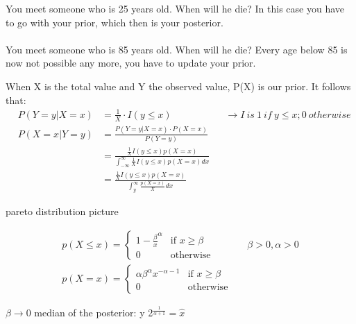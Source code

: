 \documentclass[../main/Notes.tex]{subfiles}
\begin{document}
\begin{minipage}[b][3.5cm][t]{7.1cm}
\end{minipage}
\begin{minipage}[b][4cm][t]{9.1cm}
\bigskip
You meet someone who is 25 years old. When will he die? In this case you have to go with your prior, which then is your posterior.
\\
\\
You meet someone who is 85 years old. When will he die? Every age below 85 is now not possible any more, you have to update your prior.
\end{minipage}

When X is the total value and Y the observed value, P(X) is our prior. It follows that:
\begin{align*}
& P(Y=y|X=x) & = \frac{1}{X}\cdot I(y\leq x) & & \rightarrow I~is~1~if~y\leq x ; 0~otherwise\\
& P(X=x|Y=y) & = \frac{P(Y=y|X=x) \cdot P(X=x)}{P(Y=y)} & &\\
& & =  \frac{\frac{1}{X}I(y\leq x)p(X=x)}{\int_{-\infty}^{\infty}\frac{1}{X}I(y\leq x)p(X=x)dx} & &\\
& & =  \frac{\frac{1}{X}I(y\leq x)p(X=x)}{\int_{y}^{\infty}\frac{p(X=x)}{X}dx} & &
\end{align*}

pareto distribution picture
\begin{tikzpicture}
\end{tikzpicture}
\begin{align*}
p(X \leq x) = \begin{cases} 1 - \frac{\beta}{x}^{\alpha} &\mbox{if } x \geq \beta \\ 
0 & \mbox{otherwise} \end{cases} & & \beta > 0 , \alpha > 0\\
p(X = x) = \begin{cases} \alpha \beta^{\alpha} x^{-\alpha -1} &\mbox{if } x \geq \beta \\ 
0 & \mbox{otherwise} \end{cases} 
\end{align*}

$\beta \rightarrow 0$ median of the posterior: y 2$^{\frac{1}{\alpha +1}} = \hat{x}$
\end{document}
